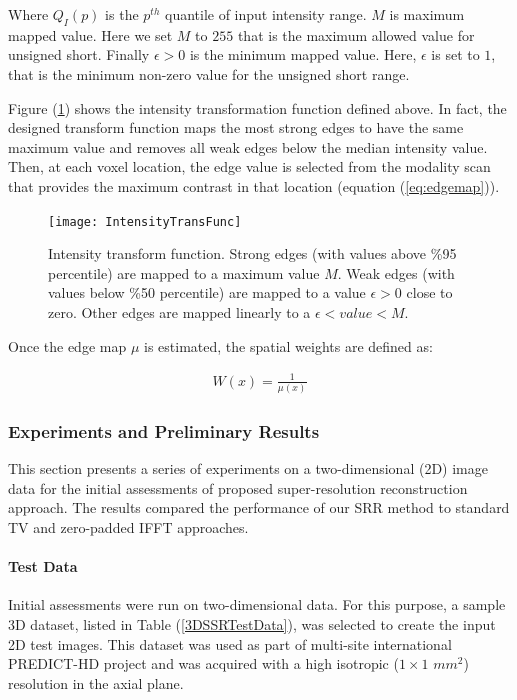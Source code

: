 Where $Q_I(p)$ is the $p^{th}$ quantile of input intensity range.
$M$ is maximum mapped value. Here we set $M$ to $255$ that is the maximum allowed value for unsigned short.
Finally $\epsilon > 0$ is the minimum mapped value. Here, $\epsilon$ is set to $1$, that is the minimum non-zero value for the unsigned short range.

Figure (\ref{IntensityTransFunc}) shows the intensity transformation function defined above.
In fact, the designed transform function maps the most strong edges to have the same maximum value and removes all weak edges below the median intensity value.
Then, at each voxel location, the edge value is selected from the modality scan that provides the maximum contrast in that location (equation (\ref{eq:edgemap})).

\begin{figure}
\centering
\texttt{[image: IntensityTransFunc]}\
\centering
\caption{Intensity transform function. Strong edges (with values above \%95 percentile) are mapped to a maximum value $M$. Weak edges (with values below \%50 percentile) are mapped to a value $\epsilon > 0$ close to zero. Other edges are mapped linearly to a $\epsilon < value < M$.}
\label{IntensityTransFunc}
\end{figure}

Once the edge map $\mu$ is estimated, the spatial weights are defined as:

\begin{equation}
\label{eq:spatialWeights}
\begin{gathered}
W(x) = \frac{1}{\mu (x)}
\end{gathered}
\end{equation}

\subsubsection{Experiments and Preliminary Results}
This section presents a series of experiments on a two-dimensional (2D) image data for the initial assessments of proposed super-resolution reconstruction approach.
The results compared the performance of our SRR method to standard TV and zero-padded IFFT approaches.

\paragraph{Test Data}
Initial assessments were run on two-dimensional data. For this purpose, a sample 3D dataset, listed in Table (\ref{3DSSRTestData}), was selected to create the input 2D test images. This dataset was used as part of multi-site international PREDICT-HD project and was acquired with a high isotropic ($1 \times 1$ $mm^2$) resolution in the axial plane.

